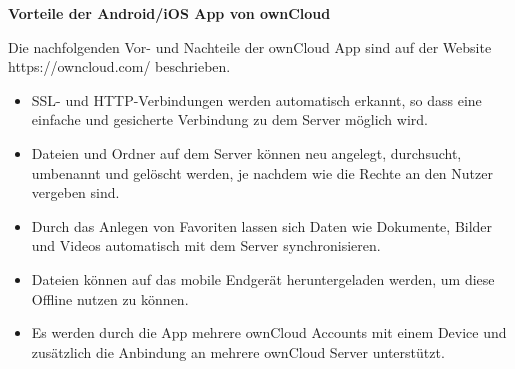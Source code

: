 \hspace{2 cm}

\textbf{Vorteile der Android/iOS App von ownCloud}

Die nachfolgenden Vor- und Nachteile der ownCloud App sind auf der Website https://owncloud.com/ beschrieben.\cite[]{WEB:OWNCLOUD:2014}

\begin{itemize}

	\item SSL- und HTTP-Verbindungen werden automatisch erkannt, so dass eine einfache und gesicherte Verbindung zu dem Server möglich wird.

	\item Dateien und Ordner auf dem Server können neu angelegt, durchsucht, umbenannt und gelöscht werden, je nachdem wie die Rechte an den Nutzer vergeben sind.

	\item Durch das Anlegen von Favoriten lassen sich Daten wie Dokumente, Bilder und Videos automatisch mit dem Server synchronisieren.

	\item Dateien können auf das mobile Endgerät heruntergeladen werden, um diese Offline nutzen zu können.

	\item Es werden durch die App mehrere ownCloud Accounts mit einem Device und zusätzlich die Anbindung an mehrere ownCloud Server unterstützt.

\end{itemize}

\hspace{2 cm}

